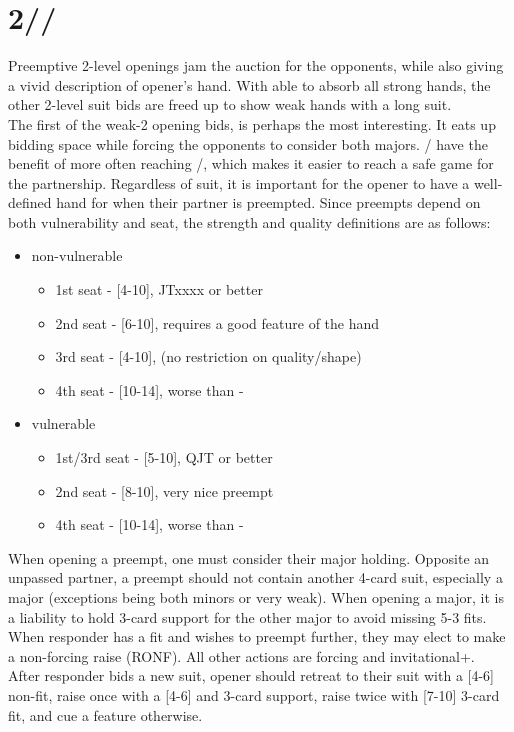 \documentclass[12pt]{report}
\newcommand{\n}{\\}
\newcommand{\q}[1]{\multido{}{#1}{\qquad}}
\newcommand{\ul}[1]{\begin{itemize}#1\end{itemize}}
\newcommand{\li}[1]{\item[~] \q{#1}}
\newcommand{\bidsection}[2]{\section{\texorpdfstring{#1}{#2}}}
\begin{document}
\bidsection{2\di{}/\he{}/\sp{}}{2♢/♡/♠} \label{2:9}

    Preemptive 2-level openings jam the auction for the opponents, while also giving a vivid description of opener's hand.  With  able to absorb all strong hands, the other 2-level suit bids are freed up to show weak hands with a long suit. \n

    The first of the weak-2 opening bids,  is perhaps the most interesting.  It eats up bidding space while forcing the opponents to consider both majors.  / have the benefit of more often reaching /, which makes it easier to reach a safe game for the partnership.  Regardless of suit, it is important for the opener to have a well-defined hand for when their partner is preempted.  Since preempts depend on both vulnerability and seat, the strength and quality definitions are as follows:

    \ul{
        \li0 non-vulnerable \ul{
            \li0 1st seat - [4-10], JTxxxx or better
            \li0 2nd seat - [6-10], requires a good feature of the hand
            \li0 3rd seat - [4-10], (no restriction on quality/shape)
            \li0 4th seat - [10-14], worse than \di1-\di2
        }

        \li0 vulnerable \ul{
            \li0 1st/3rd seat - [5-10], QJT or better
            \li0 2nd seat - [8-10], very nice preempt
            \li0 4th seat - [10-14], worse than \di1-\di2
        }
    }

    When opening a preempt, one must consider their major holding.  Opposite an unpassed partner, a preempt should not contain another 4-card suit, especially a major (exceptions being both minors or very weak).  When opening a major, it is a liability to hold 3-card support for the other major to avoid missing 5-3 fits.  When responder has a fit and wishes to preempt further, they may elect to make a non-forcing raise (RONF).  All other actions are forcing and invitational+.\n
    
    After responder bids a new suit, opener should retreat to their suit with a [4-6] non-fit, raise once with a [4-6] and 3-card support, raise twice with [7-10] 3-card fit, and cue a feature otherwise.
\end{document}
